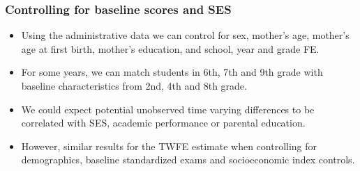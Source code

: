 \documentclass{beamer}
\begin{document}
\begin{frame}
    \label{frame:twfe_gpa_controls_intro}
    \frametitle{Controlling for baseline scores and SES}
       \begin{itemize}
           \item Using the administrative data we can control for sex, mother's age, mother's age at first birth, mother's education, and school, year and grade FE.
           \item For some years, we can match students in 6th, 7th and 9th grade with baseline characteristics from 2nd, 4th and 8th grade.
           \item We could expect potential unobserved time varying differences to be correlated with SES, academic performance or parental education.
           \item However, similar results for the TWFE estimate when controlling for demographics, baseline standardized exams and socioeconomic index controls.


       \end{itemize}
\end{frame}
\end{document}
